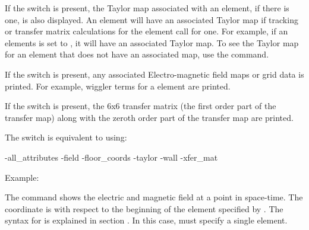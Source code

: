 {{{\begin{description}
If the  switch is present, the Taylor map associated with
an element, if there is one, is also displayed. An element will have
an associated Taylor map if tracking or transfer matrix calculations
for the element call for one. For example, if an elements
 is set to , it will have an associated
Taylor map. To see the Taylor map for an element that does not have an
associated map, use the  command.

If the  switch is present, any associated 
Electro-magnetic field maps or grid data is printed. For example, 
wiggler terms for a   element are printed.

If the  switch is present, the 6x6 transfer matrix (the
first order part of the transfer map) along with the zeroth order part
of the transfer map are printed.

The  switch is equivalent to using:
\begin{example}
  -all_attributes
  -field
  -floor_coords
  -taylor
  -wall
  -xfer_mat
\end{example}

Example:


\item[show field <ele> <x> <y> <z> \{t\} ] \Newline

The  command shows the electric and magnetic field at a
point in space-time. The  coordinate is with respect to the
beginning of the element specified by .  The syntax for
 is explained in section . In this
case,  must specify a single element.


\item[show global \{-bmad_com\} \{-csr_param\} \{-optimization\} \{-ran_state\} ] \Newline

\vskip -0.2in


\end{description}}}}
